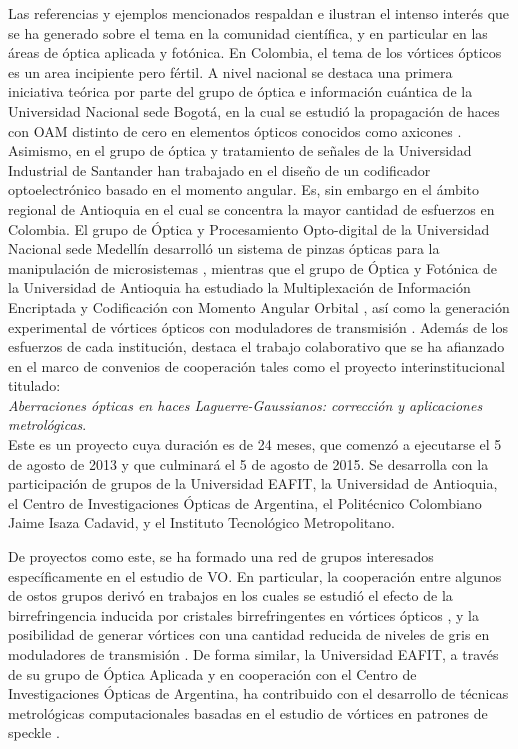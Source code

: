 Las referencias y ejemplos mencionados respaldan e ilustran el
intenso interés que se ha generado sobre el tema en la 
comunidad científica, y en particular en las áreas de óptica
aplicada y fotónica.  En Colombia, el tema de los vórtices ópticos es
un area  incipiente pero fértil. A nivel nacional se destaca una primera
iniciativa teórica por parte del grupo de óptica e información
cuántica de la  Universidad Nacional sede
Bogotá, en la cual se estudió la propagación de haces con OAM distinto de
cero en elementos ópticos conocidos como axicones
. Asimismo, en el grupo de óptica y tratamiento de
señales de la Universidad Industrial de Santander han trabajado en el diseño de un codificador optoelectrónico
basado en el momento angular. Es,
sin embargo en el ámbito regional de Antioquia en el cual se
concentra la mayor cantidad de esfuerzos en Colombia.  El grupo de
Óptica y Procesamiento Opto-digital de la Universidad 
Nacional sede Medellín desarrolló un sistema de pinzas ópticas para la
manipulación de microsistemas , mientras que el grupo de Óptica y Fotónica
de la Universidad de Antioquia ha estudiado la Multiplexación de
Información Encriptada y Codificación con Momento Angular
Orbital , así como la generación experimental de
vórtices ópticos con moduladores de transmisión
. Además de los esfuerzos
de cada institución, destaca el trabajo colaborativo que se ha afianzado en el marco de convenios de
cooperación tales como el proyecto interinstitucional titulado:\\
\textit{Aberraciones ópticas en haces Laguerre-Gaussianos: corrección
  y aplicaciones metrológicas}. \\Este es un proyecto cuya duración es  de 24 meses, que
comenzó a ejecutarse el 5 de agosto de 2013 y que culminará el 5 de
agosto de 2015. Se desarrolla con la participación de grupos de la
Universidad EAFIT, la Universidad de Antioquia, el Centro de
Investigaciones Ópticas de Argentina, el Politécnico Colombiano Jaime
Isaza Cadavid, y el Instituto Tecnológico Metropolitano. 

De proyectos como este, se ha formado una red de grupos interesados
específicamente en el estudio de VO. En particular,
la cooperación entre algunos de ostos grupos derivó en trabajos en los
cuales se estudió el efecto de la birrefringencia inducida por
cristales birrefringentes en vórtices ópticos , y la
posibilidad de generar vórtices con una cantidad reducida de niveles
de gris en moduladores de transmisión . De forma
similar, la Universidad EAFIT, a través de su grupo de Óptica Aplicada
y en cooperación con el Centro de Investigaciones Ópticas de
Argentina,  ha contribuido con el desarrollo de técnicas metrológicas
computacionales basadas en el estudio de  vórtices en patrones de
speckle
. 



